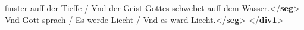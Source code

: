 \begin{shaded}
\hspace*{1em}\hspace*{1em}\hspace*{1em}\hspace*{1em}\hspace*{1em}\hspace*{1em} finster auff der Tieffe / Vnd der Geist Gottes schwebet auff\mbox{}\newline 
\hspace*{1em}\hspace*{1em}\hspace*{1em}\hspace*{1em}\hspace*{1em}\hspace*{1em} dem Wasser.{</\textbf{seg}>}\mbox{}\newline 
\hspace*{1em}\mbox{}\newline 
\hspace*{1em}\mbox{}\newline 
\hspace*{1em}\hspace*{1em}Vnd Gott sprach / Es werde Liecht / Vnd es ward\mbox{}\newline 
\hspace*{1em}\hspace*{1em}\hspace*{1em}\hspace*{1em}\hspace*{1em}\hspace*{1em} Liecht.{</\textbf{seg}>}\mbox{}\newline 
\hspace*{1em}\mbox{}\newline 
{}\mbox{}\newline 
{</\textbf{div1}>}\end{shaded}\egroup\par \noindent  \par
